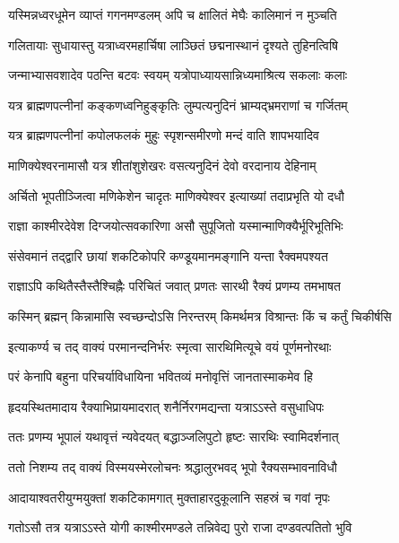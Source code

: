 \twolineshloka
{यस्मिन्नध्वरधूमेन व्याप्तं गगनमण्डलम्}
{अपि च क्षालितं मेघैः कालिमानं न मुञ्चति} %

\twolineshloka
{गलितायाः सुधायास्तु यत्राध्वरमहार्चिषा}
{लाञ्छितं छद्मनास्थानं दृश्यते तुहिनत्विषि} %

\twolineshloka
{जन्माभ्यासवशादेव पठन्ति बटवः स्वयम्}
{यत्रोपाध्यायसान्निध्यमाश्रित्य सकलाः कलाः} %

\twolineshloka
{यत्र ब्राह्मणपत्नीनां कङ्कणध्वनिहुङ्कृतिः}
{लुम्पत्यनुदिनं भ्राम्यद्भ्रमराणां च गर्जितम्} %

\twolineshloka
{यत्र ब्राह्मणपत्नीनां कपोलफलकं मुहुः}
{स्पृशन्समीरणो मन्दं वाति शापभयादिव} %

\twolineshloka
{माणिक्येश्वरनामासौ यत्र शीतांशुशेखरः}
{वसत्यनुदिनं देवो वरदानाय देहिनाम्} %

\twolineshloka
{अर्चितो भूपतीञ्जित्वा मणिकेशेन चादृतः}
{माणिक्येश्वर इत्याख्यां तदाप्रभृति यो दधौ} %

\twolineshloka
{राज्ञा काश्मीरदेवेश दिग्जयोत्सवकारिणा}
{असौ सुपूजितो यस्मान्माणिक्यैर्भूरिभूतिभिः} %

\twolineshloka
{संसेवमानं तद्द्वारि छायां शकटिकोपरि}
{कण्डूयमानमङ्गानि यन्ता रैक्वमपश्यत} %

\twolineshloka
{राज्ञाऽपि कथितैस्तैस्तैश्चिह्नैः परिचितं जवात्}
{प्रणतः सारथी रैक्यं प्रणम्य तमभाषत} %


\twolineshloka
{कस्मिन् ब्रह्मन् किन्नामासि स्वच्छन्दोऽसि निरन्तरम्}
{किमर्थमत्र विश्रान्तः किं च कर्तुं चिकीर्षसि} %

\twolineshloka
{इत्याकर्ण्य च तद् वाक्यं परमानन्दनिर्भरः}
{स्मृत्वा सारथिमित्यूचे वयं पूर्णमनोरथाः} %

\twolineshloka
{परं केनापि बहुना परिचर्याविधायिना}
{भवितव्यं मनोवृत्तिं जानतास्माकमेव हि} %

\twolineshloka
{हृदयस्थितमादाय रैक्याभिप्रायमादरात्}
{शनैर्निरगमद्यन्ता यत्राऽऽस्ते वसुधाधिपः} %

\twolineshloka
{ततः प्रणम्य भूपालं यथावृत्तं न्यवेदयत्}
{बद्धाञ्जलिपुटो हृष्टः सारथिः स्वामिदर्शनात्} %

\twolineshloka
{ततो निशम्य तद् वाक्यं विस्मयस्मेरलोचनः}
{श्रद्धालुरभवद् भूपो रैक्यसम्भावनाविधौ} %

\twolineshloka
{आदायाश्वतरीयुग्मयुक्तां शकटिकामगात्}
{मुक्ताहारदुकूलानि सहस्रं च गवां नृपः} %

\twolineshloka
{गतोऽसौ तत्र यत्राऽऽस्ते योगी काश्मीरमण्डले}
{तन्निवेद्य पुरो राजा दण्डवत्पतितो भुवि} %

